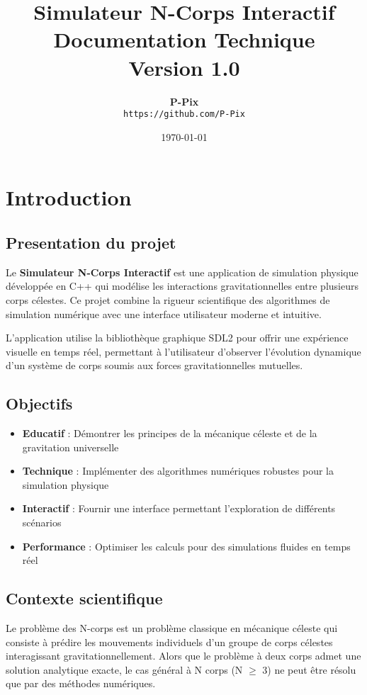 \documentclass[12pt,a4paper]{article}
\title{
    {\Huge \textbf{Simulateur N-Corps Interactif}}\\[0.5cm]
    {\Large Documentation Technique}\\[0.3cm]
    {\large Version 1.0}
}
\author{
    \textbf{P-Pix}\\
    \texttt{https://github.com/P-Pix}
}
\date{\today}
\begin{document}
\maketitle
\thispagestyle{empty}
\newpage

\tableofcontents
\newpage

\section{Introduction}

\subsection{Presentation du projet}

Le \textbf{Simulateur N-Corps Interactif} est une application de simulation physique développée en C++ qui modélise les interactions gravitationnelles entre plusieurs corps célestes. Ce projet combine la rigueur scientifique des algorithmes de simulation numérique avec une interface utilisateur moderne et intuitive.

L'application utilise la bibliothèque graphique SDL2 pour offrir une expérience visuelle en temps réel, permettant à l'utilisateur d'observer l'évolution dynamique d'un système de corps soumis aux forces gravitationnelles mutuelles.

\subsection{Objectifs}

\begin{itemize}
    \item \textbf{Educatif} : Démontrer les principes de la mécanique céleste et de la gravitation universelle
    \item \textbf{Technique} : Implémenter des algorithmes numériques robustes pour la simulation physique
    \item \textbf{Interactif} : Fournir une interface permettant l'exploration de différents scénarios
    \item \textbf{Performance} : Optimiser les calculs pour des simulations fluides en temps réel
\end{itemize}

\subsection{Contexte scientifique}

Le problème des N-corps est un problème classique en mécanique céleste qui consiste à prédire les mouvements individuels d'un groupe de corps célestes interagissant gravitationnellement. Alors que le problème à deux corps admet une solution analytique exacte, le cas général à N corps (N $\geq$ 3) ne peut être résolu que par des méthodes numériques.
\end{document}
